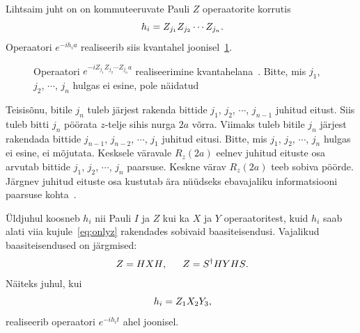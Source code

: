 \documentclass[12pt]{report}
\begin{document}
Lihtsaim juht on on kommuteeruvate Pauli \(Z\) operaatorite korrutis
\begin{equation}\label{eq:onlyz}
  h_i = Z_{j_1}Z_{j_2}\cdots Z_{j_n} \rlap{.}
\end{equation}
Operaatori \(e^{-i h_i a}\) realiseerib siis kvantahel joonisel~\ref{f:expz}.
\begin{figure}[h]
  \centering
  \ifdefined\yquanton
  \fi
  \caption{Operaatori \(e^{-iZ_{j_1}Z_{j_2}\cdots Z_{j_n}a}\) realiseerimine kvantahelana~\cite{mansky+etal, nielsen+chuang}. Bitte, mis \(j_1\), \(j_2\), \(\cdots\), \(j_n\) hulgas ei esine, pole näidatud}
  \label{f:expz}
\end{figure}
Teisisõnu, bitile \(j_n\) tuleb järjest rakenda bittide \(j_1\), \(j_2\), \(\cdots\), \(j_{n-1}\) juhitud eitust.
Siis tuleb bitti \(j_n\) pöörata \(z\)-telje sihis nurga \(2a\) võrra.
Viimaks tuleb bitile \(j_n\) järjest rakendada bittide \(j_{n-1}\), \(j_{n-2}\), \(\cdots\), \(j_1\) juhitud eitusi.
Bitte, mis \(j_1\), \(j_2\), \(\cdots\), \(j_n\) hulgas ei esine, ei mõjutata.
Kesksele väravale \(R_z(2a)\) eelnev juhitud eituste osa arvutab bittide \(j_1\), \(j_2\), \(\cdots\), \(j_n\) paarsuse.
Keskne värav \(R_z(2a)\) teeb sobiva pöörde.
Järgnev juhitud eituste osa kustutab ära nüüdseks ebavajaliku informatsiooni paarsuse kohta~\cite{nielsen+chuang}.

Üldjuhul koosneb \(h_i\) nii Pauli \(I\) ja \(Z\) kui ka \(X\) ja \(Y\) operaatoritest, kuid \(h_i\) saab alati viia kujule~\eqref{eq:onlyz} rakendades sobivaid baasiteisendusi.
Vajalikud baasiteisendused on järgmised:
\begin{align}
    Z = HXH \rlap{,}\qquad Z = S^\dagger HYHS \rlap{.}
\end{align}
Näiteks juhul, kui
\begin{equation}
  h_i = Z_1X_2Y_3 \rlap{,}
\end{equation}
realiseerib operaatori \(e^{-i h_i t}\) ahel joonisel.
\end{document}
